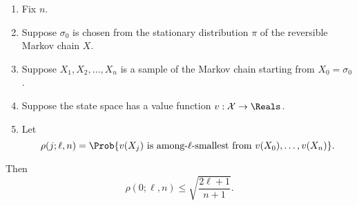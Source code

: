 \documentclass[12pt]{article}
\begin{document}
\begin{proposition}
    \label{thm:serialsignificance:basethm}
    \begin{enumerate}
        \item
            Fix \( n \).
        \item
            Suppose \( \sigma_0 \) is chosen from the stationary
            distribution \( \pi \) of the reversible Markov chain \( X \).
        \item
            Suppose \( X_1, X_2, \dots, X_n \) is a sample of the Markov
            chain starting from \( X_0 = \sigma_0 \).
        \item
            Suppose the state space has a value function \( v : \mathcal
            {X} \to \Reals \).
        \item
            Let
            \[
                \rho(j; \ell, n) = \Prob{v(X_j) \text{ is among-\( \ell \)-smallest
                from } v(X_0), \dots, v(X_n) }.
            \]
    \end{enumerate}

    Then
    \[
        \rho(0; \ell, n) \le \sqrt{ \frac{2\ell + 1}{n+1}}.
    \]
\end{proposition}
\end{document}
